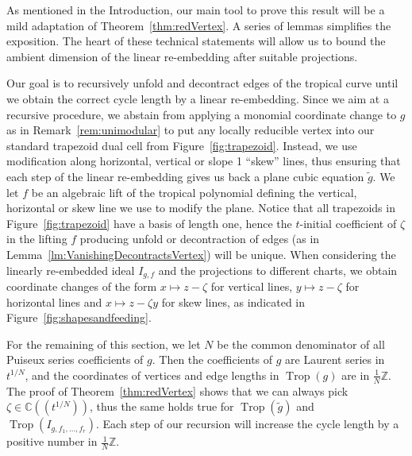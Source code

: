 \documentclass[11pt]{amsart}
\numberwithin{equation}{section}
\theoremstyle{plain}
\theoremstyle{definition}
\theoremstyle{remark}
\begin{document}
As mentioned in the Introduction, our main tool to prove this result
will be a mild adaptation of Theorem~\ref{thm:redVertex}. A series of
lemmas simplifies the exposition. The heart of these technical
statements will allow us to bound the ambient dimension of the linear
re-embedding after suitable projections.

Our goal is to recursively unfold and decontract edges of the tropical
curve until we obtain the correct cycle length by a linear
re-embedding.  Since we aim at a recursive procedure, we abstain from
applying a monomial coordinate change to $g$ as in
Remark~\ref{rem:unimodular} to put any locally reducible vertex into
our standard trapezoid dual cell from
Figure~\ref{fig:trapezoid}. Instead, we use modification along
horizontal, vertical or slope 1 ``skew'' lines, thus ensuring that
each step of the linear re-embedding gives us back a plane cubic
equation $\tilde{g}$. We let $f$ be an algebraic lift of the tropical
polynomial defining the vertical, horizontal or skew line we use to
modify the plane. Notice that all trapezoids in
Figure~\ref{fig:trapezoid} have a basis of length one, hence the
$t$-initial coefficient of ${\zeta}$ in the lifting $f$ producing unfold
or decontraction of edges (as in
Lemma~\ref{lm:VanishingDecontractsVertex}) will be unique.  When
considering the linearly re-embedded ideal $I_{g,f}$ and the
projections to different charts, we obtain coordinate changes of the
form $x\mapsto z-{\zeta}$ for vertical lines, $y\mapsto z-{\zeta}$ for
horizontal lines and $x\mapsto z-{\zeta} y$ for skew lines, as indicated
in Figure~\ref{fig:shapesandfeeding}.

For the remaining of this section, we let $N$ be the common
denominator of all Puiseux series coefficients of $g$. Then the
coefficients of $g$ are Laurent series in $t^{1/N}$, and the
coordinates of vertices and edge lengths in $\operatorname{Trop}(g)$ are in
$\frac{1}{N}{\mathbb{Z}}$.  The proof of Theorem~\ref{thm:redVertex} shows that
we can always pick ${\zeta}\in {\mathbb{C}}(\!(t^{1/N})\!)$, thus the same holds
true for $\operatorname{Trop}(\tilde{g})$ and $\operatorname{Trop}(I_{g,f_1,\ldots, f_r})$.  Each
step of our recursion will increase the cycle length by a positive
number in $\frac{1}{N}{\mathbb{Z}}$.
\end{document}
